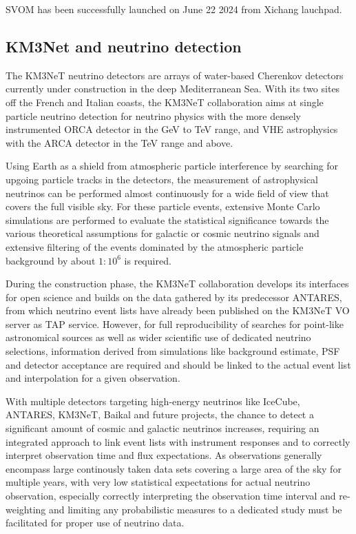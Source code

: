\documentclass[11pt,a4paper]{ivoa}
\begin{document}
SVOM has been successfully launched on June 22 2024 from  Xichang lauchpad.


\subsection{KM3Net and neutrino detection}

The KM3NeT neutrino detectors are arrays of water-based Cherenkov detectors currently under construction in the deep
Mediterranean Sea. With its two sites off the French and Italian coasts, the KM3NeT collaboration aims at single particle
neutrino detection for neutrino physics with the more densely instrumented ORCA detector in the GeV to TeV range, and
VHE astrophysics with the ARCA detector in the TeV range and above.

Using Earth as a shield from atmospheric particle interference by searching for upgoing particle tracks in the detectors,
the measurement of astrophysical neutrinos can be performed almost continuously for a wide field of view that covers the
full visible sky. For these particle events, extensive Monte Carlo simulations are performed to evaluate the
statistical significance towards the various theoretical assumptions for galactic or cosmic neutrino signals and extensive filtering of the events dominated by the atmospheric particle background by about $1:10^{6}$ is required.

During the construction phase, the KM3NeT collaboration develops its interfaces for open science and builds on the data
gathered by its predecessor ANTARES, from which neutrino event lists have already been published on the KM3NeT VO server
as TAP service. However, for full reproducibility of searches for point-like astronomical sources as well as wider scientific use of dedicated neutrino selections,
information derived from simulations like background estimate, PSF and detector acceptance are required and should be linked
to the actual event list and interpolation for a given observation.

With multiple detectors targeting high-energy neutrinos like IceCube, ANTARES, KM3NeT, Baikal and future projects, the
chance to detect a significant amount of cosmic and galactic neutrinos increases, requiring an integrated approach to
link event lists with instrument responses and to correctly interpret observation time and flux expectations. As observations
generally encompass large continously taken data sets covering a large area of the sky for multiple years, with very low statistical
expectations for actual neutrino observation, especially correctly interpreting the observation time interval and re-weighting and limiting any probabilistic
measures to a dedicated study must be facilitated for proper use of neutrino data.
\end{document}
